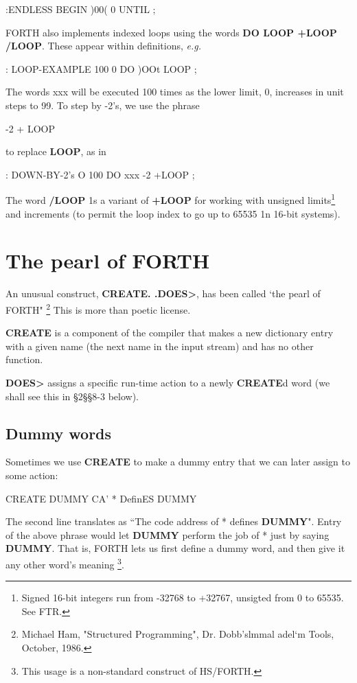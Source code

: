 :ENDLESS BEGIN )00( 0 UNTIL ;

FORTH also implements indexed loops using the words \textbf{DO LOOP +LOOP /LOOP}. These appear within definitions, \textit{\textit{e.g.}}

: LOOP-EXAMPLE 100 0 DO )OOt LOOP ;

The words xxx will be executed 100 times as the lower limit, 0, increases in unit steps to 99. To step by -2's, we use the phrase

-2 + LOOP

to replace \textbf{LOOP}, as in

: DOWN-BY-2's O 100 DO xxx -2 +LOOP ;

The word \textbf{/LOOP} 1s a variant of \textbf{+LOOP} for working with unsigned limits\footnote{Signed 16-bit integers run from -32768 to +32767, unsigted from 0 to 65535. See FTR.} and increments (to permit the loop index to go up to 65535 1n 16-bit systems).

\section{The pearl of FORTH}

An unusual construct, \textbf{CREATE. .DOES>}, has been called ‘the pearl of FORTH" \footnote{Michael Ham, "Structured Programming", Dr. Dobb’slmmal adel‘m Tools, October, 1986.} This is more than poetic license.

\textbf{CREATE} is a component of the compiler that makes a new dictionary entry with a given name (the next name in the input stream) and has no other function.

\textbf{DOES>} assigns a specific run-time action to a newly \textbf{CREATE}d word (we shall see this in §2§§8-3 below).

\subsection{Dummy words}
Sometimes we use \textbf{CREATE} to make a dummy entry that we can later assign to some action:

CREATE DUMMY
CA' * DefinES DUMMY

The second line translates as ``The code address of * defines \textbf{DUMMY}". Entry of the above phrase would let \textbf{DUMMY} perform the job of * just by saying \textbf{DUMMY}. That is, FORTH lets us first define a dummy word, and then give it any other word’s meaning \footnote{This usage is a non-standard construct of HS/FORTH.}.

